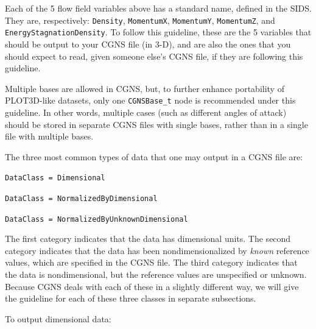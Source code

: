 \documentclass[12pt]{article}
\begin{document}
Each of the 5 flow field variables above has a standard name, defined in the SIDS.  They
are, respectively:  {\tt Density}, {\tt MomentumX}, {\tt MomentumY},
{\tt MomentumZ}, and {\tt EnergyStagnationDensity}.  To follow this
guideline, these are the 5 variables that should be output to your
CGNS file (in 3-D), and are also the ones that you should expect to read,
given someone else's CGNS file, if they are following this guideline.

Multiple bases are allowed in CGNS, but, to further enhance
portability of PLOT3D-like datasets, only one {\tt CGNSBase\_t} node is 
recommended under this guideline.  In other words, multiple cases
(such as different angles of attack) should be stored in separate
CGNS files with single bases, rather than in a single file with multiple bases.

The three most common types of data that one may output in a CGNS file are:

{\tt DataClass = Dimensional}

{\tt DataClass = NormalizedByDimensional}

{\tt DataClass = NormalizedByUnknownDimensional}

The first category indicates that the data has dimensional units.
The second category indicates that
the data has been nondimensionalized by {\it known} reference
values, which are specified in the CGNS file.  
The third category indicates that the data is nondimensional,
but the reference values are
unspecified or unknown.  Because CGNS deals with each of these in a 
slightly different way, we will give the guideline for each of
these three classes in separate subsections.

 \label{sec:dimdata}

To output dimensional data:
\end{document}
